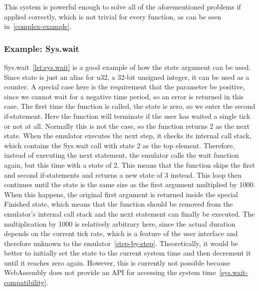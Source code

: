 This system is powerful enough to solve all of the aforementioned problems if applied correctly, which is not trivial for every function, as can be seen in~\cref{complex-example}.
\subsubsection{Example: Sys.wait} \label{sys.wait-example}
Sys.wait~\ref{lst:sys.wait} is a good example of how the state argument can be used.
Since state is just an alias for u32, a 32-bit unsigned integer, it can be used as a counter.
A special case here is the requirement that the parameter be positive, since we cannot wait for a negative time period, so an error is returned in this case.
The first time the function is called, the state is zero, so we enter the second if-statement. Here the function will terminate if the user has waited a single tick or not at all.
Normally this is not the case, so the function returns 2 as the next state.
When the emulator executes the next step, it checks its internal call stack, which contains the Sys.wait call with state 2 as the top element.
Therefore, instead of executing the next statement, the emulator calls the wait function again, but this time with a state of 2. This means that the function skips the first and second if-statements and returns a new state of 3 instead.
This loop then continues until the state is the same size as the first argument multiplied by 1000. When this happens, the original first argument is returned inside the special Finished state, which means that the function should be removed from the emulator's internal call stack and the next statement can finally be executed.
The multiplication by 1000 is relatively arbitrary here, since the actual duration depends on the current tick rate, which is a feature of the user interface and therefore unknown to the emulator~\ref{step-by-step}.
Theoretically, it would be better to initially set the state to the current system time and then decrement it until it reaches zero again. However, this is currently not possible because WebAssembly does not provide an API for accessing the system time~\ref{sys.wait-compatibility}.

